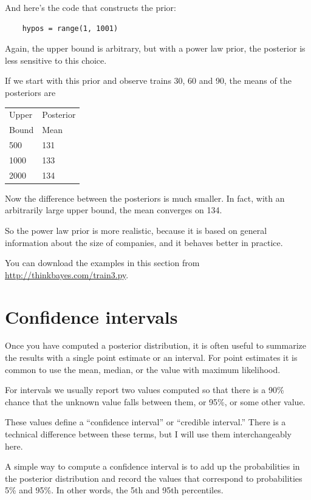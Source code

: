 \documentclass[12pt]{book}
\begin{document}
And here's the code that constructs the prior:

\begin{verbatim}
    hypos = range(1, 1001)
\end{verbatim}

Again, the upper bound is arbitrary, but with a power law
prior, the posterior is less sensitive to this choice.

If we start with this prior and observe trains 30, 60 and 90,
the means of the posteriors are

  \begin{tabular}{|l|l|}
  \hline
  Upper & Posterior \\
  Bound & Mean \\
  \hline
  500 & 131 \\
  1000 & 133 \\
  2000 & 134 \\
  \hline
  \end{tabular}

Now the difference between the posteriors is much smaller.  In fact,
with an arbitrarily large upper bound, the mean converges on 134.

So the power law prior is more realistic, because it is based on
general information about the size of companies, and it
behaves better in practice.

You can download the examples in this section from
\url{http://thinkbayes.com/train3.py}.

\section{Confidence intervals}

Once you have computed a posterior distribution, it is often useful
to summarize the results with a single point estimate or an interval.
For point estimates it is common to use the mean, median, or the
value with maximum likelihood.

For intervals we usually report two values computed
so that there is a 90\% chance that the unknown value falls
between them, or 95\%, or some other value.

These values define a ``confidence interval'' or ``credible interval.''
There is a technical difference between these terms, but I will
use them interchangeably here.

A simple way to compute a confidence interval is to add up the
probabilities in the posterior distribution and record the values
that correspond to probabilities 5\% and 95\%.  In other words,
the 5th and 95th percentiles.
\end{document}

